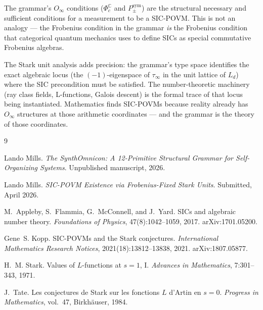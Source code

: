 \documentclass[12pt]{article}
\theoremstyle{plain}
\theoremstyle{definition}
\theoremstyle{remark}
\newcommand{\tauinf}{\tau_\infty}
\begin{document}
The grammar's $O_\infty$ conditions ($\Phi_c^\mathbb{C}$ and $P_{\pm}^{\text{sym}}$) are the
structural necessary and sufficient conditions for a measurement to be a SIC-POVM. This is not
an analogy — the Frobenius condition in the grammar \emph{is} the Frobenius condition that
categorical quantum mechanics uses to define SICs as special commutative Frobenius algebras.

The Stark unit analysis adds precision: the grammar's type space identifies the exact algebraic
locus (the $(-1)$-eigenspace of $\tauinf$ in the unit lattice of $L_d$) where the SIC
precondition must be satisfied. The number-theoretic machinery (ray class fields, L-functions,
Galois descent) is the formal trace of that locus being instantiated. Mathematics finds
SIC-POVMs because reality already has $O_\infty$ structures at those arithmetic coordinates —
and the grammar is the theory of those coordinates.


\begin{thebibliography}{9}

Lando Mills.
\emph{The SynthOmnicon: A 12-Primitive Structural Grammar for Self-Organizing Systems}.
Unpublished manuscript, 2026.

Lando Mills.
\emph{SIC-POVM Existence via Frobenius-Fixed Stark Units}.
Submitted, April 2026.

M.~Appleby, S.~Flammia, G.~McConnell, and J.~Yard.
SICs and algebraic number theory.
\emph{Foundations of Physics}, 47(8):1042--1059, 2017.
arXiv:1701.05200.

Gene~S. Kopp.
SIC-POVMs and the Stark conjectures.
\emph{International Mathematics Research Notices}, 2021(18):13812--13838, 2021.
arXiv:1807.05877.

H.~M. Stark.
Values of $L$-functions at $s=1$, I.
\emph{Advances in Mathematics}, 7:301--343, 1971.

J.~Tate.
Les conjectures de Stark sur les fonctions $L$ d'Artin en $s=0$.
\emph{Progress in Mathematics}, vol.~47, Birkh\"{a}user, 1984.

\end{thebibliography}
\end{document}
